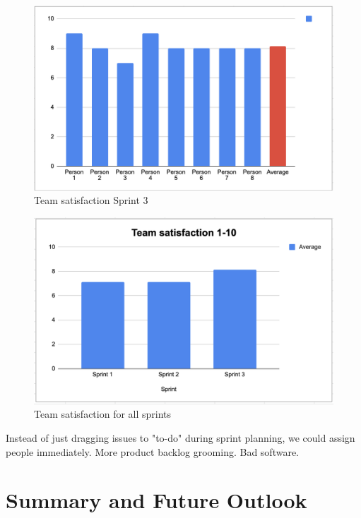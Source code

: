 \documentclass{article}
\begin{document}
\begin{figure}[h!]
    \centering
    \includegraphics[scale=0.6]{pfrFigures/TeamSatisfactionSprint3.png}
    \caption{Team satisfaction Sprint 3}
    \label{fig:satisfaction3}
\end{figure}

\begin{figure}[h!]
    \centering
    \includegraphics[scale=0.6]{pfrFigures/ToptalSatisfaction.png}
    \caption{Team satisfaction for all sprints}
    \label{fig:totalSatisfaction}
\end{figure}

Instead of just dragging issues to "to-do" during sprint planning, we could assign people immediately. More product backlog grooming. Bad software.

\section{Summary and Future Outlook}
\end{document}
